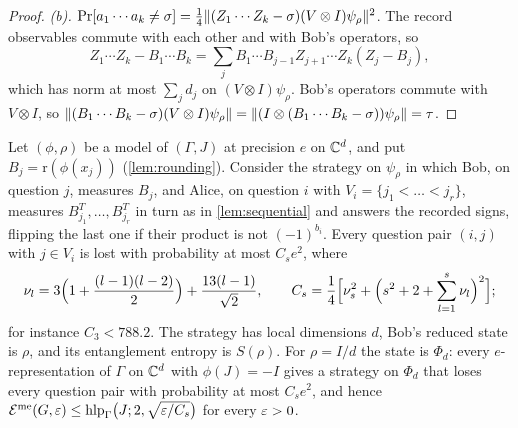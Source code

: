 \begin{proof}
\emph{(b).} $\Pr[a_1\cdots a_k\ne\sigma]=\frac14\lVert (Z_1\cdots Z_k-\sigma)(V\otimes I)\psi_\rho\rVert^2$. The record observables commute with each
other and with Bob's operators, so
\[
Z_1\cdots Z_k-B_1\cdots B_k=\sum_jB_1\cdots B_{j-1}Z_{j+1}\cdots Z_k(Z_j-B_j),
\]
which has norm at most $\sum_jd_j$ on $(V\otimes I)\psi_\rho$. Bob's operators commute with $V\otimes I$, so
$\lVert (B_1\cdots B_k-\sigma)(V\otimes I)\psi_\rho\rVert=\lVert (I\otimes(B_1\cdots B_k-\sigma))\psi_\rho\rVert=\tau$.
\end{proof}

\begin{theorem}[Return]\label{thm:return}
Let $(\phi,\rho)$ be a model of $(\Gamma,J)$ at precision $e$ on $\mathbb C^d$, and put $B_j=\mathrm r(\phi(x_j))$ (\cref{lem:rounding}). Consider
the strategy on $\psi_\rho$ in which Bob, on question $j$, measures $B_j$, and Alice, on question $i$ with $V_i=\{j_1<\dots<j_r\}$,
measures $B_{j_1}^T,\dots,B_{j_r}^T$ in turn as in \cref{lem:sequential} and answers the recorded signs, flipping the last one if their
product is not $(-1)^{b_i}$. Every question pair $(i,j)$ with $j\in V_i$ is lost with probability at most $C_se^2$, where
\[
\nu_l=3\Bigl(1+\frac{(l-1)(l-2)}2\Bigr)+\frac{13(l-1)}{\sqrt2},\qquad C_s=\frac14\Bigl[\nu_s^2+\Bigl(s^2+2+\sum_{l=1}^s\nu_l\Bigr)^2\Bigr];
\]
for instance $C_3<788.2$. The strategy has local dimensions $d$, Bob's reduced state is $\rho$, and its entanglement entropy is $S(\rho)$.
For $\rho=I/d$ the state is $\Phi_d$: every $e$-representation of $\Gamma$ on $\mathbb C^d$ with $\phi(J)=-I$ gives a strategy on $\Phi_d$ that loses
every question pair with probability at most $C_se^2$, and hence $\mathcal E^{\mathrm{me}}(G,\varepsilon)\le\operatorname{hlp}_\Gamma\bigl(J;2,\sqrt{\varepsilon/C_s}\bigr)$ for every
$\varepsilon>0$.
\end{theorem}

